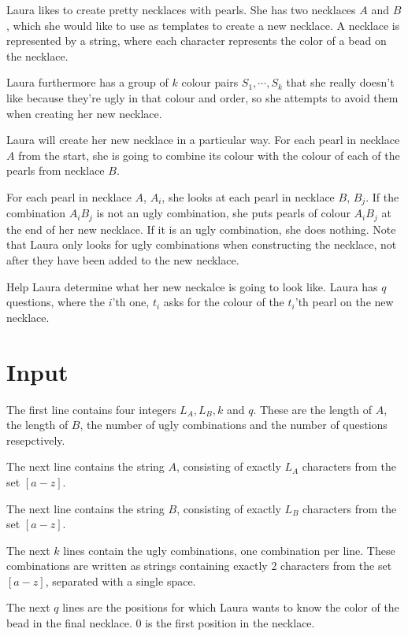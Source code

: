 \noindent
Laura likes to create pretty necklaces with pearls. 
She has two necklaces $A$ and $B$, which she would like to use as templates to create a new necklace.
A necklace is represented by a string, where each character represents the color of a bead on the necklace.

Laura furthermore has a group of $k$ colour pairs $S_1, \cdots, S_k$ 
that she really doesn't like because they're ugly in that colour and order, 
so she attempts to avoid them when creating her new necklace.

Laura will create her new necklace in a particular way. 
For each pearl in necklace $A$ from the start, 
she is going to combine its colour with the colour of each of 
the pearls from necklace $B$.

For each pearl in necklace $A$, $A_i$, 
she looks at each pearl in necklace $B$, $B_j$.
If the combination $A_iB_j$ is not an ugly combination, she puts pearls of colour $A_iB_j$ at the end of her new necklace.
If it is an ugly combination, she does nothing. 
Note that Laura only looks for ugly combinations when constructing the necklace, not after they have been added to the new necklace.

Help Laura determine what her new neckalce is going to look like. Laura has $q$ questions, where the $i$'th one, $t_i$ asks for the colour of the $t_i$'th pearl on the new necklace.

\section*{Input}
The first line contains four integers $L_A, L_B, k$ and $q$. 
These are the length of $A$, the length of $B$, the number of ugly combinations and the number of questions resepctively.

The next line contains the string $A$, consisting of exactly $L_A$ characters from the set $[a-z]$.

The next line contains the string $B$, consisting of exactly $L_B$ characters from the set $[a-z]$.

The next $k$ lines contain the ugly combinations, one combination per line. 
These combinations are written as strings containing exactly 2 characters from the set $[a-z]$, separated with a single space.

The next $q$ lines are the positions for which Laura wants to know the color of the bead in the final necklace. 
0 is the first position in the necklace.

